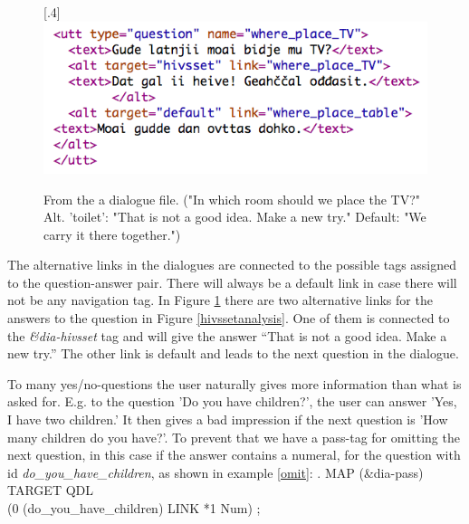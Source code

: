\documentclass[11pt]{article}
\begin{document}
\begin{figure}[htbp]
\begin{center}
\scalebox{.4}[.4]{\includegraphics{presentation/img/whereTV.png}}\\
\caption{From the a dialogue file. ("In which room should we place the TV?" Alt. 'toilet': "That is not a good idea. Make a new try." Default: "We carry it there together.") 
}
\label{altlinks}
\end{center}
\end{figure}

The alternative links in the dialogues are connected to the possible tags assigned to the question-answer pair. There will always be a default link in case there will not be any navigation tag. In Figure \ref{altlinks} there are two alternative links for the answers to the question in Figure \ref{hivssetanalysis}. One of them is connected to the \textit{\&dia-hivsset} tag and will give the answer “That is not a good idea. Make a new try.” The other link is default and leads to the next question in the dialogue. 

To many yes/no-questions the user naturally gives more information than what is asked for. E.g. to the question 'Do you have children?', the user can answer 'Yes, I have two children.' It then gives a bad impression if the next question is 'How many children do you have?'. To prevent that we have a pass-tag for omitting the next question, in this case if the answer contains a numeral, for the question with id \textit{do\_you\_have\_children}, as shown in example \ref{omit}:
\ex.\label{omit} \small MAP (\&dia-pass) TARGET QDL \\ (0 (do\_you\_have\_children) LINK *1 Num) ;


\end{document}
